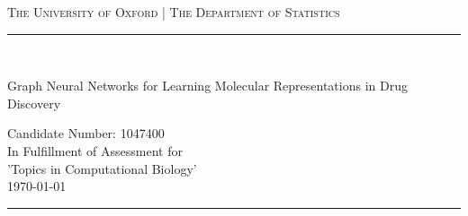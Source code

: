 \begin{titlingpage}
\begin{center}
		
		
		
		
		
		\textsc{\centering The University of Oxford | The Department of Statistics}\\[0.2cm]
		
		\newcommand{\HRule}{\rule{\linewidth}{0.5mm}}
		
		
		\begin{flushright}
			\HRule \\[.05cm]
		{  \huge \sc Graph Neural Networks for Learning Molecular Representations in Drug Discovery\par }
		\vspace*{.6cm}
		{\Large \sc Candidate Number: 1047400}\\[0.6cm]
		{\large In Fulfillment of Assessment for \\ 'Topics in Computational Biology'}\\[0.2cm]
		{\today}\\[.05cm]
		\HRule \\[0.4cm]
		\end{flushright}
		
	\end{center}

\tableofcontents
\end{titlingpage}



\setcounter{tocdepth}{2}

